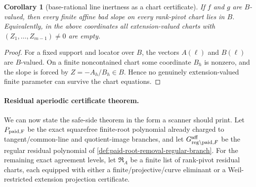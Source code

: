 \documentclass[11pt]{article}
\newtheorem{corollary}[corollary]{Corollary}
\theoremstyle{definition}
\theoremstyle{remark}
\newcommand{\B}{B}
\begin{document}
\begin{corollary}[base-rational line inertness as a chart certificate]
\label{cor:base-rational-line-inertness-chart}
If $f$ and $g$ are $\B$-valued, then every finite affine bad slope on every
rank-pivot chart lies in $\B$.  Equivalently, in the above coordinates all
extension-valued charts with $(Z_1,\ldots,Z_{m-1})\ne0$ are empty.
\end{corollary}

\begin{proof}
For a fixed support and locator over $\B$, the vectors $A(\ell)$ and $B(\ell)$
are $\B$-valued.  On a finite noncontained chart some coordinate $B_h$ is
nonzero, and the slope is forced by
$Z=-A_h/B_h\in\B$.  Hence no genuinely extension-valued finite parameter can
survive the chart equations.
\end{proof}

\paragraph{Residual aperiodic certificate theorem.}
We can now state the safe-side theorem in the form a scanner should print.  Let
$P_{\rm paid,F}$ be the exact squarefree finite-root polynomial already charged
to tangent/common-line and quotient-image branches, and let
$G_{{\rm reg}\setminus{\rm paid},F}^{\rm aff}$ be the regular residual polynomial
of \cref{def:paid-root-removal-regular-branch}.  For the remaining exact
agreement levels, let $\mathfrak R_A$ be a finite list of rank-pivot residual
charts, each equipped with either a finite/projective/curve eliminant or a
Weil-restricted extension projection certificate.
\end{document}

